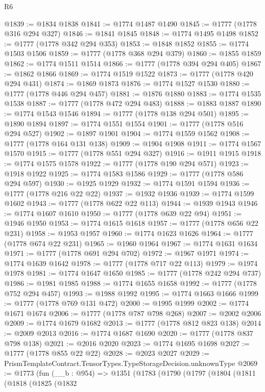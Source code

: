 \begin{lexlean}{R6}
\begin{coremodule}
@1839 := @1834 @1838
@1841 := @1774 @1487 @1490
@1845 := @1777 (@1778 @316 @294 @327)
@1846 := @1841 @1845
@1848 := @1774 @1495 @1498
@1852 := @1777 (@1778 @342 @294 @353)
@1853 := @1848 @1852
@1855 := @1774 @1503 @1506
@1859 := @1777 (@1778 @368 @294 @379)
@1860 := @1855 @1859
@1862 := @1774 @1511 @1514
@1866 := @1777 (@1778 @394 @294 @405)
@1867 := @1862 @1866
@1869 := @1774 @1519 @1522
@1873 := @1777 (@1778 @420 @294 @431)
@1874 := @1869 @1873
@1876 := @1774 @1527 @1530
@1880 := @1777 (@1778 @446 @294 @457)
@1881 := @1876 @1880
@1883 := @1774 @1535 @1538
@1887 := @1777 (@1778 @472 @294 @483)
@1888 := @1883 @1887
@1890 := @1774 @1543 @1546
@1894 := @1777 (@1778 @138 @294 @501)
@1895 := @1890 @1894
@1897 := @1774 @1551 @1554
@1901 := @1777 (@1778 @516 @294 @527)
@1902 := @1897 @1901
@1904 := @1774 @1559 @1562
@1908 := @1777 (@1778 @164 @131 @138)
@1909 := @1904 @1908
@1911 := @1774 @1567 @1570
@1915 := @1777 (@1778 @551 @294 @327)
@1916 := @1911 @1915
@1918 := @1774 @1575 @1578
@1922 := @1777 (@1778 @190 @294 @571)
@1923 := @1918 @1922
@1925 := @1774 @1583 @1586
@1929 := @1777 (@1778 @586 @294 @597)
@1930 := @1925 @1929
@1932 := @1774 @1591 @1594
@1936 := @1777 (@1778 @216 @22 @22)
@1937 := @1932 @1936
@1939 := @1774 @1599 @1602
@1943 := @1777 (@1778 @622 @22 @113)
@1944 := @1939 @1943
@1946 := @1774 @1607 @1610
@1950 := @1777 (@1778 @639 @22 @94)
@1951 := @1946 @1950
@1953 := @1774 @1615 @1618
@1957 := @1777 (@1778 @656 @22 @231)
@1958 := @1953 @1957
@1960 := @1774 @1623 @1626
@1964 := @1777 (@1778 @674 @22 @231)
@1965 := @1960 @1964
@1967 := @1774 @1631 @1634
@1971 := @1777 (@1778 @691 @294 @702)
@1972 := @1967 @1971
@1974 := @1774 @1639 @1642
@1978 := @1777 (@1778 @717 @22 @113)
@1979 := @1974 @1978
@1981 := @1774 @1647 @1650
@1985 := @1777 (@1778 @242 @294 @737)
@1986 := @1981 @1985
@1988 := @1774 @1655 @1658
@1992 := @1777 (@1778 @752 @294 @457)
@1993 := @1988 @1992
@1995 := @1774 @1663 @1666
@1999 := @1777 (@1778 @769 @131 @472)
@2000 := @1995 @1999
@2002 := @1774 @1671 @1674
@2006 := @1777 (@1778 @787 @798 @268)
@2007 := @2002 @2006
@2009 := @1774 @1679 @1682
@2013 := @1777 (@1778 @812 @823 @138)
@2014 := @2009 @2013
@2016 := @1774 @1687 @1690
@2020 := @1777 (@1778 @837 @798 @138)
@2021 := @2016 @2020
@2023 := @1774 @1695 @1698
@2027 := @1777 (@1778 @855 @22 @22)
@2028 := @2023 @2027
@2029 := PrismTemplateContract.TensorTypes.TypeStorageDecision.unknownType
@2069 := @1773
    (fun (__b : @954) =>
    @1351
      (@1783
        (@1790
          (@1797
            (@1804
              (@1811
                (@1818
                  (@1825
                    (@1832

\end{coremodule}
\end{lexlean}
